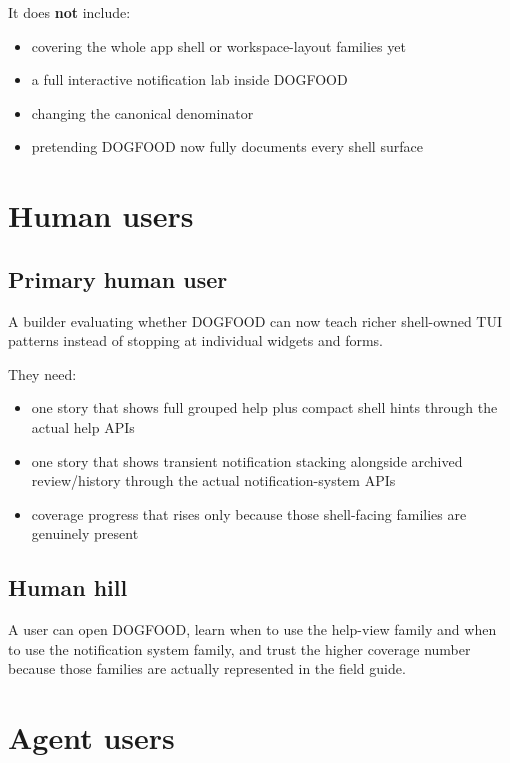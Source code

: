 It does \textbf{not} include:

\begin{itemize}
\tightlist
\item
  covering the whole app shell or workspace-layout families yet
\item
  a full interactive notification lab inside DOGFOOD
\item
  changing the canonical denominator
\item
  pretending DOGFOOD now fully documents every shell surface
\end{itemize}

\section{Human users}\label{record-075-human-users}

\subsection{Primary human user}\label{record-075-primary-human-user}

A builder evaluating whether DOGFOOD can now teach richer shell-owned TUI patterns instead of stopping at individual widgets and forms.

They need:

\begin{itemize}
\tightlist
\item
  one story that shows full grouped help plus compact shell hints through the actual help APIs
\item
  one story that shows transient notification stacking alongside archived review/history through the actual notification-system APIs
\item
  coverage progress that rises only because those shell-facing families are genuinely present
\end{itemize}

\subsection{Human hill}\label{record-075-human-hill}

A user can open DOGFOOD, learn when to use the help-view family and when to use the notification system family, and trust the higher coverage number because those families are actually represented in the field guide.

\section{Agent users}\label{record-075-agent-users}

